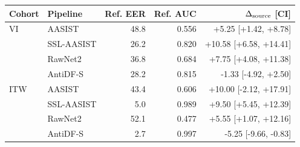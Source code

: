 \begin{tabular}{@{}llrrr@{}}
\toprule
Cohort & Pipeline & Ref. EER & Ref. AUC & $\Delta_{\rm source}$ [CI] \\
\midrule
VI & AASIST & 48.8 & 0.556 & +5.25 [+1.42, +8.78] \\
 & SSL-AASIST & 26.2 & 0.820 & +10.58 [+6.58, +14.41] \\
 & RawNet2 & 36.8 & 0.684 & +7.75 [+4.08, +11.38] \\
 & AntiDF-S & 28.2 & 0.815 & -1.33 [-4.92, +2.50] \\
ITW & AASIST & 43.4 & 0.606 & +10.00 [-2.12, +17.91] \\
 & SSL-AASIST & 5.0 & 0.989 & +9.50 [+5.45, +12.39] \\
 & RawNet2 & 52.1 & 0.477 & +5.55 [+1.07, +12.16] \\
 & AntiDF-S & 2.7 & 0.997 & -5.25 [-9.66, -0.83] \\
\bottomrule
\end{tabular}
